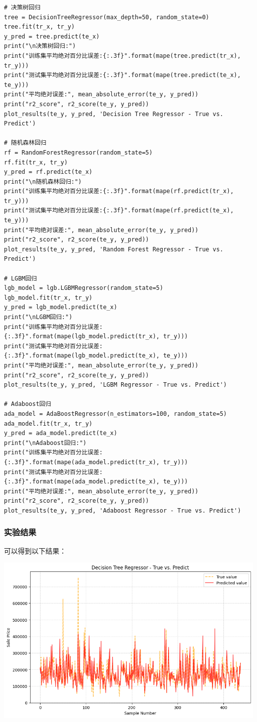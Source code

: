 \documentclass[a4paper,12pt]{article}
\begin{document}
\begin{lstlisting}
# 决策树回归
tree = DecisionTreeRegressor(max_depth=50, random_state=0)
tree.fit(tr_x, tr_y)
y_pred = tree.predict(te_x)
print("\n决策树回归:")
print("训练集平均绝对百分比误差:{:.3f}".format(mape(tree.predict(tr_x), tr_y)))
print("测试集平均绝对百分比误差:{:.3f}".format(mape(tree.predict(te_x), te_y)))
print("平均绝对误差:", mean_absolute_error(te_y, y_pred))
print("r2_score", r2_score(te_y, y_pred))
plot_results(te_y, y_pred, 'Decision Tree Regressor - True vs. Predict')

# 随机森林回归
rf = RandomForestRegressor(random_state=5)
rf.fit(tr_x, tr_y)
y_pred = rf.predict(te_x)
print("\n随机森林回归:")
print("训练集平均绝对百分比误差:{:.3f}".format(mape(rf.predict(tr_x), tr_y)))
print("测试集平均绝对百分比误差:{:.3f}".format(mape(rf.predict(te_x), te_y)))
print("平均绝对误差:", mean_absolute_error(te_y, y_pred))
print("r2_score", r2_score(te_y, y_pred))
plot_results(te_y, y_pred, 'Random Forest Regressor - True vs. Predict')

# LGBM回归
lgb_model = lgb.LGBMRegressor(random_state=5)
lgb_model.fit(tr_x, tr_y)
y_pred = lgb_model.predict(te_x)
print("\nLGBM回归:")
print("训练集平均绝对百分比误差:{:.3f}".format(mape(lgb_model.predict(tr_x), tr_y)))
print("测试集平均绝对百分比误差:{:.3f}".format(mape(lgb_model.predict(te_x), te_y)))
print("平均绝对误差:", mean_absolute_error(te_y, y_pred))
print("r2_score", r2_score(te_y, y_pred))
plot_results(te_y, y_pred, 'LGBM Regressor - True vs. Predict')

# Adaboost回归
ada_model = AdaBoostRegressor(n_estimators=100, random_state=5)
ada_model.fit(tr_x, tr_y)
y_pred = ada_model.predict(te_x)
print("\nAdaboost回归:")
print("训练集平均绝对百分比误差:{:.3f}".format(mape(ada_model.predict(tr_x), tr_y)))
print("测试集平均绝对百分比误差:{:.3f}".format(mape(ada_model.predict(te_x), te_y)))
print("平均绝对误差:", mean_absolute_error(te_y, y_pred))
print("r2_score", r2_score(te_y, y_pred))
plot_results(te_y, y_pred, 'Adaboost Regressor - True vs. Predict')

\end{lstlisting}

\subsubsection{实验结果}
可以得到以下结果：

\centering
\includegraphics[width=0.75\linewidth]{images/kaggle_DecisionTree.png}
\justifying
\end{document}

